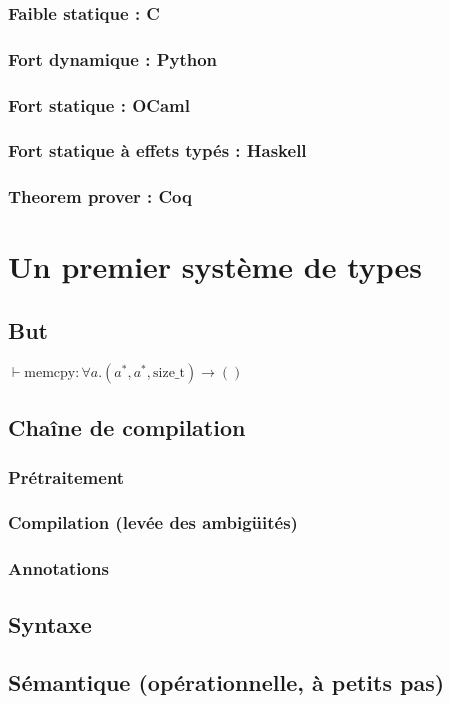 \documentclass{phdthesis}
\begin{document}
\subsection{Faible statique : C}
\subsection{Fort dynamique : Python}
\subsection{Fort statique : OCaml}
\subsection{Fort statique à effets typés : Haskell}
\subsection{Theorem prover : Coq}

\chapter{Un premier système de types}

\section{But}

$⊢ \text{memcpy} : ∀ a . (a^*, a^*, \text{size\_t}) → ()$

\section{Chaîne de compilation}
\subsection{Prétraitement}
\subsection{Compilation (levée des ambigüités)}
\subsection{Annotations}
\section{Syntaxe}
\section{Sémantique (opérationnelle, à petits pas)}
\end{document}
